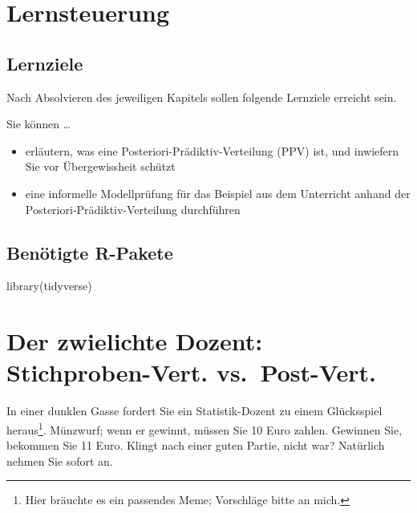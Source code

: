 \documentclass[
  a4paper,
  DIV=11]{scrreprt}
\newenvironment{Shaded}{\begin{snugshade}}{\end{snugshade}}
\newcommand{\FunctionTok}[1]{\textcolor[rgb]{0.28,0.35,0.67}{#1}}
\newcommand{\NormalTok}[1]{\textcolor[rgb]{0.00,0.23,0.31}{#1}}
\providecommand{\tightlist}{%
  \setlength{\itemsep}{0pt}\setlength{\parskip}{0pt}}\usepackage{longtable,booktabs,array}
\theoremstyle{definition}
\theoremstyle{remark}
\begin{document}
\hypertarget{lernsteuerung-5}{%
\section{Lernsteuerung}\label{lernsteuerung-5}}

\hypertarget{lernziele-6}{%
\subsection{Lernziele}\label{lernziele-6}}

Nach Absolvieren des jeweiligen Kapitels sollen folgende Lernziele
erreicht sein.

Sie können \ldots{}

\begin{itemize}
\tightlist
\item
  erläutern, was eine Posteriori-Prädiktiv-Verteilung (PPV) ist, und
  inwiefern Sie vor Übergewissheit schützt
\item
  eine informelle Modellprüfung für das Beispiel aus dem Unterricht
  anhand der Posteriori-Prädiktiv-Verteilung durchführen
\end{itemize}

\hypertarget{benuxf6tigte-r-pakete-3}{%
\subsection{Benötigte R-Pakete}\label{benuxf6tigte-r-pakete-3}}

\begin{Shaded}
\begin{Highlighting}[]
\FunctionTok{library}\NormalTok{(tidyverse)}
\end{Highlighting}
\end{Shaded}

\hypertarget{der-zwielichte-dozent-stichproben-vert.-vs.-post-vert.}{%
\section{Der zwielichte Dozent: Stichproben-Vert.
vs.~Post-Vert.}\label{der-zwielichte-dozent-stichproben-vert.-vs.-post-vert.}}

In einer dunklen Gasse fordert Sie ein Statistik-Dozent zu einem
Glücksspiel heraus\footnote{Hier bräuchte es ein passendes Meme;
  Vorschläge bitte an mich.}. Münzwurf; wenn er gewinnt, müssen Sie 10
Euro zahlen. Gewinnen Sie, bekommen Sie 11 Euro. Klingt nach einer guten
Partie, nicht war? Natürlich nehmen Sie sofort an.
\end{document}
